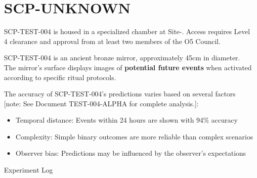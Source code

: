 \section{SCP-UNKNOWN}


\containment

SCP-TEST-004 is housed in a specialized chamber at Site-. Access requires Level 4 clearance and approval from at least two members of the O5 Council.

\scpdescription

SCP-TEST-004 is an ancient bronze mirror, approximately 45cm in diameter. The mirror's surface displays images of \textbf{potential future events} when activated according to specific ritual protocols.

The accuracy of SCP-TEST-004's predictions varies based on several factors [note: See Document TEST-004-ALPHA for complete analysis.]:

\begin{itemize}
\item Temporal distance: Events within 24 hours are shown with 94\% accuracy
\item Complexity: Simple binary outcomes are more reliable than complex scenarios
\item Observer bias: Predictions may be influenced by the observer's expectations
\end{itemize}


Experiment Log



